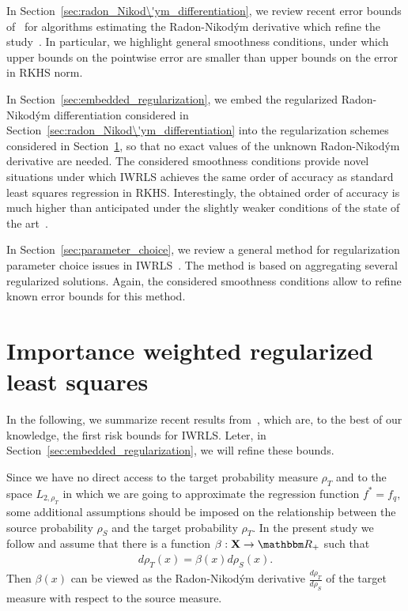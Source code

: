 \documentclass[USenglish]{article}
\def\R{\mathbbm R}
\begin{document}
In Section~\ref{sec:radon_Nikod\'ym_differentiation}, we review recent error bounds of~\cite{nguyen2023regularized} for algorithms estimating the Radon-Nikod\'ym derivative which refine the study~\cite{gizewski2022regularization}.
In particular, we highlight general smoothness conditions, under which upper bounds on the pointwise error are smaller than upper bounds on the error in RKHS norm.

In Section~\ref{sec:embedded_regularization}, we embed the regularized Radon-Nikod\'ym differentiation considered in Section~\ref{sec:radon_Nikod\'ym_differentiation} into the regularization schemes considered in Section~\ref{sec2}, so that no exact values of the unknown Radon-Nikod\'ym derivative are needed.
The considered smoothness conditions provide novel situations under which IWRLS achieves the same order of accuracy as standard least squares regression in RKHS.
Interestingly, the obtained order of accuracy is much higher than anticipated under the slightly weaker conditions of the state of the art~\cite{gizewski2022regularization}.

In Section~\ref{sec:parameter_choice}, we review a general method for regularization parameter choice issues in IWRLS~\cite{gizewski2022regularization,dinu2022aggregation}.
The method is based on aggregating several regularized solutions.
Again, the considered smoothness conditions allow to refine known error bounds for this method.


\section{Importance weighted regularized least squares}
\label{sec2}

In the following, we summarize recent results from~\cite{gizewski2022regularization}, which are, to the best of our knowledge, the first risk bounds for IWRLS.
Leter, in Section~\ref{sec:embedded_regularization}, we will refine these bounds.

Since we have no direct access to the target probability measure $  \rho_T  $ and to the space $     {L_{2,\rho_T}}  $ in which we are going to approximate the regression function $f^* = f_q,$ some additional assumptions should be imposed on the relationship between the source probability $ \rho_S $ and the target probability $  \rho_T  $.
In the present study we follow \cite{huang2006} and assume that there is a function $\beta: \mathbf{X} \rightarrow \R_+$ such that 
	\begin{align*}
	d\rho_T (x) = \beta (x)  d\rho_S (x).
	\end{align*}
Then $\beta (x)$ can be viewed as the Radon-Nikod\'ym derivative $\frac{d\rho_T}{d\rho_S}$ of the target measure with respect to the source measure.
\end{document}
